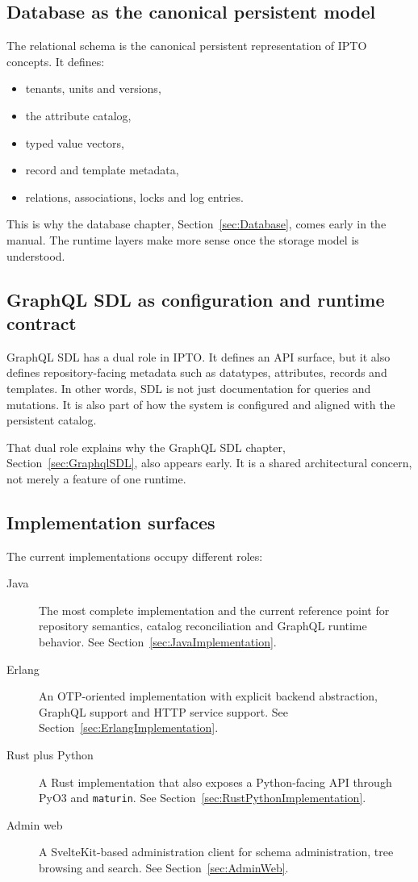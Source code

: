 \subsection{Database as the canonical persistent model}

The relational schema is the canonical persistent representation of IPTO concepts. It defines:
\begin{itemize}
\item tenants, units and versions,
\item the attribute catalog,
\item typed value vectors,
\item record and template metadata,
\item relations, associations, locks and log entries.
\end{itemize}

This is why the database chapter, Section~\ref{sec:Database}, comes early in the manual. The runtime layers make more sense once the storage model is understood.

\subsection{GraphQL SDL as configuration and runtime contract}

GraphQL SDL has a dual role in IPTO. It defines an API surface, but it also defines repository-facing metadata such as datatypes, attributes, records and templates. In other words, SDL is not just documentation for queries and mutations. It is also part of how the system is configured and aligned with the persistent catalog.

That dual role explains why the GraphQL SDL chapter, Section~\ref{sec:GraphqlSDL}, also appears early. It is a shared architectural concern, not merely a feature of one runtime.

\subsection{Implementation surfaces}

The current implementations occupy different roles:
\begin{description}
\item[Java] The most complete implementation and the current reference point for repository semantics, catalog reconciliation and GraphQL runtime behavior. See Section~\ref{sec:JavaImplementation}.
\item[Erlang] An OTP-oriented implementation with explicit backend abstraction, GraphQL support and HTTP service support. See Section~\ref{sec:ErlangImplementation}.
\item[Rust plus Python] A Rust implementation that also exposes a Python-facing API through PyO3 and \texttt{maturin}. See Section~\ref{sec:RustPythonImplementation}.
\item[Admin web] A SvelteKit-based administration client for schema administration, tree browsing and search. See Section~\ref{sec:AdminWeb}.
\end{description}

